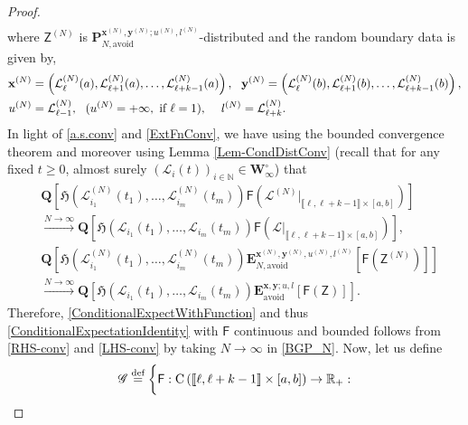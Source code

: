 \documentclass[]{article}
\begin{document}
\begin{proof}
\begin{align}
\end{align}
where
$\mathsf{Z}^{(N)}$
is 
$\mathbf{P}_{N,\mathrm{avoid}}^{\mathbf{x}^{(N)},\mathbf{y}^{(N)};u^{(N)},l^{(N)}}$-distributed and the random boundary data is given by,
\begin{align*}
\mathbf{x}^{(N)}&=
\left(\mathcal{L}_{\ell}^{(N)}(a),\mathcal{L}_{\ell +1}^{(N)}(a),\dots,\mathcal{L}_{\ell+k-1}^{(N)}(a)\right),\  \ \mathbf{y}^{(N)}=
\left(\mathcal{L}_{\ell}^{(N)}(b),\mathcal{L}_{\ell+1}^{(N)}(b),\dots,\mathcal{L}_{\ell+k-1}^{(N)}(b)\right),
\\ u^{(N)}&=
\mathcal{L}_{\ell-1}^{(N)},\  \  (u^{(N)}=+\infty, \textnormal{ if } \ell=1),\hspace{2mm}\  \ l^{(N)}=
\mathcal{L}_{\ell+k}^{(N)}.
\end{align*} 
In light of \eqref{a.s.conv}
and \eqref{ExtFnConv}, 
we have using the bounded convergence theorem  and moreover using Lemma \ref{Lem-CondDistConv} (recall that for any fixed $t\ge 0$, almost surely $(\mathcal{L}_i(t))_{i\in \mathbb{N}}\in \mathbf{W}_\infty^\circ$)
that
\begin{align}
&\mathbf{Q}\left[\mathfrak{H}\left (\mathcal{L}^{(N)}_{i_1}(t_1), \ldots, \mathcal{L}^{(N)}_{i_m}(t_m)\right) \mathsf{F}\left(\mathcal{L}^{(N)}|_{\llbracket \ell, \ell+k-1\rrbracket \times [a,b]}\right)\right]\nonumber \\
&\xrightarrow{N \to \infty}
\mathbf{Q}\left[\mathfrak{H}\left (\mathcal{L}_{i_1}(t_1), \ldots, \mathcal{L}_{i_m}(t_m)\right)\mathsf{F}\left(\mathcal{L}|_{\llbracket \ell, \ell+k-1\rrbracket \times [a,b]}\right)\right], \label{RHS-conv}
\\
&\mathbf{Q}\left[\mathfrak{H}\left (\mathcal{L}^{(N)}_{i_1}(t_1), \ldots, \mathcal{L}^{(N)}_{i_m}(t_m)\right)\mathbf{E}_{N,\mathrm{avoid}}^{\mathbf{x}^{(N)},\mathbf{y}^{(N)},u^{(N)},l^{(N)}}\left[\mathsf{F}\left(\mathsf{Z}^{(N)}\right)\right]\right]\nonumber
\\
&\xrightarrow{N \to \infty}
\mathbf{Q}\left[\mathfrak{H}\left (\mathcal{L}_{i_1}(t_1), \ldots, \mathcal{L}_{i_m}(t_m)\right)\mathbf{E}_{\mathrm{avoid}}^{\mathbf{x},\mathbf{y};u,l}[\mathsf{F}(\mathsf{Z})]\right].\label{LHS-conv}
\end{align}
Therefore, \eqref{ConditionalExpectWithFunction} and thus \eqref{ConditionalExpectationIdentity} with $\mathsf{F}$ continuous and bounded follows from
\eqref{RHS-conv} and \eqref{LHS-conv} by taking $N\to\infty$ in \eqref{BGP_N}.
Now, let us define
\begin{align*}
    \mathscr{G}\overset{\textnormal{def}}{=}  \bigg\{ &\mathsf{F} :\mathrm{C}\left(\llbracket \ell, \ell+k-1\rrbracket \times [a,b]\right)\to\mathbb{R}_+:  \\

\end{align*}
\end{proof}
\end{document}
